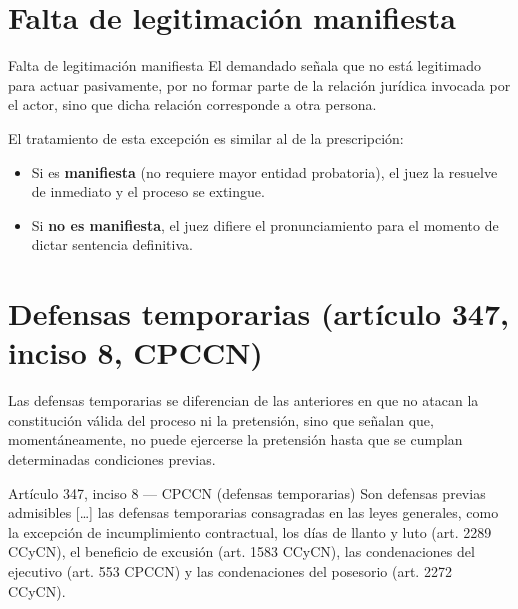 \documentclass[12pt,oneside]{book}
\begin{document}
\section{Falta de legitimación manifiesta}

\begin{definition}{Falta de legitimación manifiesta}
El demandado señala que no está legitimado para actuar pasivamente, por no formar parte de la relación jurídica invocada por el actor, sino que dicha relación corresponde a otra persona.
\end{definition}

El tratamiento de esta excepción es similar al de la prescripción:

\begin{itemize}
    \item Si es \textbf{manifiesta} (no requiere mayor entidad probatoria), el juez la resuelve de inmediato y el proceso se extingue.
    \item Si \textbf{no es manifiesta}, el juez difiere el pronunciamiento para el momento de dictar sentencia definitiva.
\end{itemize}

\section{Defensas temporarias (artículo 347, inciso 8, CPCCN)}

Las defensas temporarias se diferencian de las anteriores en que no atacan la constitución válida del proceso ni la pretensión, sino que señalan que, momentáneamente, no puede ejercerse la pretensión hasta que se cumplan determinadas condiciones previas.

\begin{definition}{Artículo 347, inciso 8 --- CPCCN (defensas temporarias)}
Son defensas previas admisibles [\ldots] las defensas temporarias consagradas en las leyes generales, como la excepción de incumplimiento contractual, los días de llanto y luto (art. 2289 CCyCN), el beneficio de excusión (art. 1583 CCyCN), las condenaciones del ejecutivo (art. 553 CPCCN) y las condenaciones del posesorio (art. 2272 CCyCN).
\end{definition}
\end{document}

